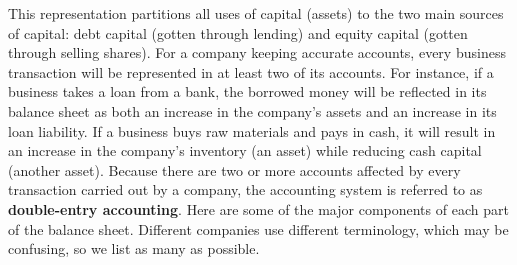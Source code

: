 \documentclass{article}
\begin{document}
    This representation partitions all uses of capital (assets) to the two main sources of capital: debt capital (gotten through lending) and equity capital (gotten through selling shares). For a company keeping accurate accounts, every business transaction will be represented in at least two of its accounts. For instance, if a business takes a loan from a bank, the borrowed money will be reflected in its balance sheet as both an increase in the company's assets and an increase in its loan liability. If a business buys raw materials and pays in cash, it will result in an increase in the company's inventory (an asset) while reducing cash capital (another asset). Because there are two or more accounts affected by every transaction carried out by a company, the accounting system is referred to as \textbf{double-entry accounting}. Here are some of the major components of each part of the balance sheet. Different companies use different terminology, which may be confusing, so we list as many as possible.
\end{document}
